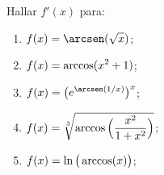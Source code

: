 \item Hallar $f'(x)$ para:
\begin{multicols}{2}

  \begin{enumerate}
    \item $\D f(x) = \arcsen(\sqrt x)$;
    \item $\displaystyle f(x) = \arccos(x^2+1)$;
    \item $\D f(x) = \big(e^{\arcsen (1/x)}\big)^x$;
    \item $\displaystyle f(x) = \sqrt[3]{\arccos\Big(\frac{x^2}{1+x^2}\Big)}$;
    \item $\displaystyle f(x) = \ln\big(\arccos (x)\big)$;
  \end{enumerate}
  
\end{multicols}